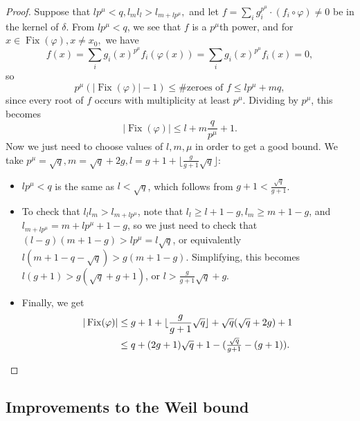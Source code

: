 \documentclass[letterpaper,11pt]{article}
\DeclareMathOperator{\Fix}{Fix}
\begin{document}
\begin{proof}
Suppose that $lp^{\mu} < q, l_ml_l > l_{m+lp^{\mu}},$ and let $f = \sum_i g_i^{p^{\mu}} \cdot (f_i\circ \varphi) \ne 0$ be in the kernel of $\delta$. From $lp^{\mu} < q$, we see that $f$ is a $p^{\mu}$th power, and for $x \in \Fix(\varphi), x \ne x_0,$ we have
\[
f(x) = \sum_i g_i(x)^{p^{\mu}}f_i(\varphi(x)) = \sum_i g_i(x)^{p^{\mu}}f_i(x) = 0,
\]
so
\[
p^{\mu}(|\Fix(\varphi)|-1) \le \#\text{zeroes of }f \le lp^{\mu} + mq,
\]
since every root of $f$ occurs with multiplicity at least $p^{\mu}$. Dividing by $p^{\mu}$, this becomes
\[
|\Fix(\varphi)| \le l + m\frac{q}{p^{\mu}} + 1.
\]
Now we just need to choose values of $l, m, \mu$ in order to get a good bound. We take $p^{\mu} = \sqrt{q}, m = \sqrt{q} + 2g, l = g+1 + \lfloor\frac{g}{g+1}\sqrt{q}\rfloor$:
\begin{itemize}
\item $lp^{\mu} < q$ is the same as $l < \sqrt{q}$, which follows from $g+1 < \frac{\sqrt{q}}{g+1}$.

\item To check that $l_ll_m > l_{m+lp^{\mu}}$, note that $l_l \ge l+1-g, l_m \ge m+1-g$, and $l_{m+lp^{\mu}} = m + lp^{\mu} + 1-g$, so we just need to check that $(l-g)(m+1-g) > lp^{\mu} = l\sqrt{q}$, or equivalently $l(m+1-q-\sqrt{q}) > g(m+1-g)$. Simplifying, this becomes $l(g+1) > g(\sqrt{q}+g+1)$, or $l > \frac{g}{g+1}\sqrt{q} + g$.

\item Finally, we get
\begin{align*}
|\Fix(\varphi)| &\le g+1+\lfloor\frac{g}{g+1}\sqrt{q}\rfloor + \sqrt{q}(\sqrt{q}+2g)+1\\
&\le q + (2g+1)\sqrt{q} + 1 - (\tfrac{\sqrt{q}}{g+1} - (g+1)).\qedhere
\end{align*}
\end{itemize}
\end{proof}

\subsection{Improvements to the Weil bound}
\end{document}
